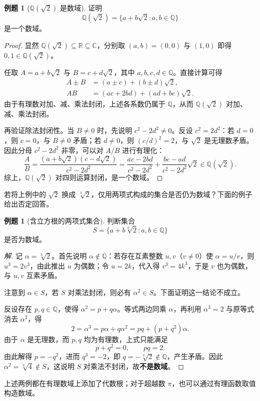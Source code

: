 \documentclass[UTF8, fontset=fandol, a4paper, 12pt]{ctexart}
\newcommand{\Q}{\mathbb{Q}}
\newcommand{\R}{\mathbb{R}}
\newcommand{\C}{\mathbb{C}}
\theoremstyle{definition}
\newtheorem{example}[definition]{例题}
\begin{document}
\begin{example}[$\Q(\sqrt2)$ 是数域]
证明
\[
  \Q(\sqrt2)=\{a+b\sqrt2:a,b\in\Q\}
\]
是一个数域。
\end{example}
\begin{proof}
显然 $\Q(\sqrt2)\subseteq\R\subseteq\C$，分别取 $(a,b)=(0,0)$ 与 $(1,0)$ 即得 $0,1\in\Q(\sqrt2)$。

任取 $A=a+b\sqrt2$ 与 $B=c+d\sqrt2$，其中 $a,b,c,d\in\Q$。直接计算可得
\begin{align*}
  A\pm B&=(a\pm c)+(b\pm d)\sqrt2,\\
  AB&=(ac+2bd)+(ad+bc)\sqrt2.
\end{align*}
由于有理数对加、减、乘法封闭，上述各系数仍属于 $\Q$，从而 $\Q(\sqrt2)$ 对加、减、乘法封闭。

再验证除法封闭性。当 $B\ne0$ 时，先说明 $c^2-2d^2\ne0$。反设 $c^2=2d^2$：若 $d=0$，则 $c=0$，与 $B\ne0$ 矛盾；若 $d\ne0$，则 $(c/d)^2=2$，与 $\sqrt2$ 是无理数矛盾。因此分母 $c^2-2d^2$ 非零，可以对 $A/B$ 进行有理化：
\[
  \frac AB
  =\frac{(a+b\sqrt2)(c-d\sqrt2)}{c^2-2d^2}
  =\frac{ac-2bd}{c^2-2d^2}
   +\frac{bc-ad}{c^2-2d^2}\sqrt2
  \in\Q(\sqrt2).
\]
综上，$\Q(\sqrt2)$ 对四则运算封闭，是一个数域。
\end{proof}

若将上例中的 $\sqrt2$ 换成 $\sqrt[3]{2}$，仅用两项式构成的集合是否仍为数域？下面的例子给出否定回答。

\begin{example}[含立方根的两项式集合]
判断集合
\[
  S=\{a+b\sqrt[3]{2}:a,b\in\Q\}
\]
是否为数域。
\end{example}
\begin{proof}[解]
记 $\alpha=\sqrt[3]{2}$。首先说明 $\alpha\notin\Q$：若存在互素整数 $u,v$（$v\ne0$）使 $\alpha=u/v$，则 $u^3=2v^3$，由此推出 $u$ 为偶数；令 $u=2k$，代入得 $v^3=4k^3$，于是 $v$ 也为偶数，与 $u,v$ 互素矛盾。

注意到 $\alpha\in S$，若 $S$ 对乘法封闭，则必有 $\alpha^2\in S$。下面证明这一结论不成立。

反设存在 $p,q\in\Q$，使得 $\alpha^2=p+q\alpha$。等式两边同乘 $\alpha$，再利用 $\alpha^3=2$ 与原等式消去 $\alpha^2$，得
\[
  2=\alpha^3=p\alpha+q\alpha^2
   =pq+(p+q^2)\alpha.
\]
由于 $\alpha$ 是无理数，而 $p,q$ 均为有理数，上式只能满足
\[
  p+q^2=0,\qquad pq=2.
\]
由此解得 $p=-q^2$，进而 $q^3=-2$，即 $q=-\sqrt[3]{2}\notin\Q$，产生矛盾。因此 $\alpha^2=\sqrt[3]{4}\notin S$，这说明 $S$ 对乘法不封闭，故\textbf{不是数域}。
\end{proof}

上述两例都在有理数域上添加了代数根；对于超越数 $\pi$，也可以通过有理函数取值构造数域。
\end{document}

